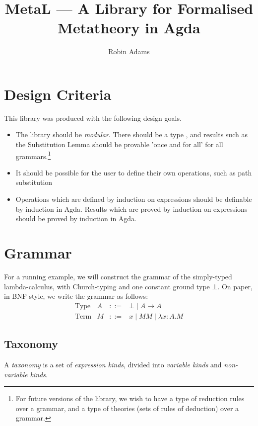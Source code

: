 \documentclass{article}
\title{MetaL --- A Library for Formalised Metatheory in Agda}
\author{Robin Adams}
\begin{document}
\maketitle

\section{Design Criteria}

This library was produced with the following design goals.

\begin{itemize}
\item
The library should be \emph{modular}.  There should be a type , and results such as the Substitution Lemma  should be
provable 'once and for all' for all grammars.\footnote{For future versions of the library, we wish to have a type of reduction rules over a grammar, and a type of theories (sets of rules of deduction) over a grammar.}
\item
It should be possible for the user to define their own operations, such as path substitution 
\item
Operations which are defined by induction on expressions should be definable by induction in Agda.  Results which are proved by induction on expressions should be proved by induction in Agda.
\end{itemize}

\section{Grammar}

For a running example, we will construct the grammar of the simply-typed lambda-calculus, with Church-typing and one constant ground type $\bot$.  On paper, in BNF-style, we write the grammar as follows:
\[ \begin{array}{lrcl}
\text{Type} & A & ::= & \bot \mid A \rightarrow A \\
\text{Term} & M & ::= & x \mid MM \mid \lambda x : A . M
\end{array} \]

\subsection{Taxonomy}

A \emph{taxonomy} is a set of \emph{expression kinds}, divided into \emph{variable kinds} and \emph{non-variable kinds}.
\end{document}
